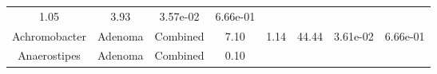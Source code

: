 \documentclass[12pt,]{article}
\begin{document}
\begin{longtable}[]{@{}cccccccc@{}}
\begin{minipage}[t]{0.13\columnwidth}
1.05\strut
\end{minipage} & \begin{minipage}[t]{0.13\columnwidth}\centering\strut
3.93\strut
\end{minipage} & \begin{minipage}[t]{0.07\columnwidth}\centering\strut
3.57e-02\strut
\end{minipage} & \begin{minipage}[t]{0.07\columnwidth}\centering\strut
6.66e-01\strut
\end{minipage}\tabularnewline
\begin{minipage}[t]{0.16\columnwidth}\centering\strut
Achromobacter\strut
\end{minipage} & \begin{minipage}[t]{0.08\columnwidth}\centering\strut
Adenoma\strut
\end{minipage} & \begin{minipage}[t]{0.09\columnwidth}\centering\strut
Combined\strut
\end{minipage} & \begin{minipage}[t]{0.05\columnwidth}\centering\strut
7.10\strut
\end{minipage} & \begin{minipage}[t]{0.13\columnwidth}\centering\strut
1.14\strut
\end{minipage} & \begin{minipage}[t]{0.13\columnwidth}\centering\strut
44.44\strut
\end{minipage} & \begin{minipage}[t]{0.07\columnwidth}\centering\strut
3.61e-02\strut
\end{minipage} & \begin{minipage}[t]{0.07\columnwidth}\centering\strut
6.66e-01\strut
\end{minipage}\tabularnewline
\begin{minipage}[t]{0.16\columnwidth}\centering\strut
Anaerostipes\strut
\end{minipage} & \begin{minipage}[t]{0.08\columnwidth}\centering\strut
Adenoma\strut
\end{minipage} & \begin{minipage}[t]{0.09\columnwidth}\centering\strut
Combined\strut
\end{minipage} & \begin{minipage}[t]{0.05\columnwidth}\centering\strut
0.10\strut
\end{minipage} & \begin{minipage}[t]{0.13\columnwidth}\centering\strut

\end{minipage}
\end{longtable}
\end{document}
